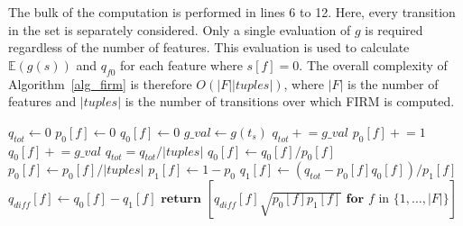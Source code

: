 \documentclass[letterpaper]{article} %
\newcommand{\pluseq}{\mathrel{+}=}
\begin{document}
The bulk of the computation is performed in lines 6 to 12. Here, every transition in the set is separately considered. Only a single evaluation of $g$ is required regardless of the number of features. This evaluation is used to calculate $\mathbb{E}(g(s))$ and $q_{f0}$ for each feature where $s[f] = 0$. The overall complexity of Algorithm~\ref{alg_firm} is therefore $O(|F| |tuples|)$, where $|F|$ is the number of features and $|tuples|$ is the number of transitions over which FIRM is computed. 

\begin{algorithm}[t] 
\caption{Compute feature importance for all features for given set of transitions.} \label{alg_firm}
\begin{algorithmic}[1]
    \State $q_{tot} \leftarrow 0$ 
      \State $p_0[f] \leftarrow 0$ 
      \State $q_0[f] \leftarrow 0$ 
    \EndFor
      \State $g\_val \leftarrow g(t_s)$
      \State $q_{tot} \pluseq g\_val$ 
         
          \State $p_0[f] \pluseq 1$
          \State $q_0[f] \pluseq g\_val$
        \EndIf
      \EndFor
    \EndFor
    \State $q_{tot} = q_{tot} / |tuples|$ 
     
      \State $q_0[f] \leftarrow q_0[f] / p_0[f]$
      \State $p_0[f] \leftarrow p_0[f] / |tuples|$
      \State $p_1[f] \leftarrow 1 - p_0$
      \State $q_1[f] \leftarrow (q_{tot} - p_0[f] q_0[f]) / p_1[f]$
      \State $q_{diff}[f] \leftarrow q_0[f] - q_1[f]$
    \EndFor
    \State $\textbf{return } [ q_{diff}[f] \sqrt{p_0[f] p_1[f]} 
    \textbf{ for } f \textrm{ in } \{1, \ldots, |F|\}]$
  \EndProcedure
\end{algorithmic}
\end{algorithm}
\end{document}
